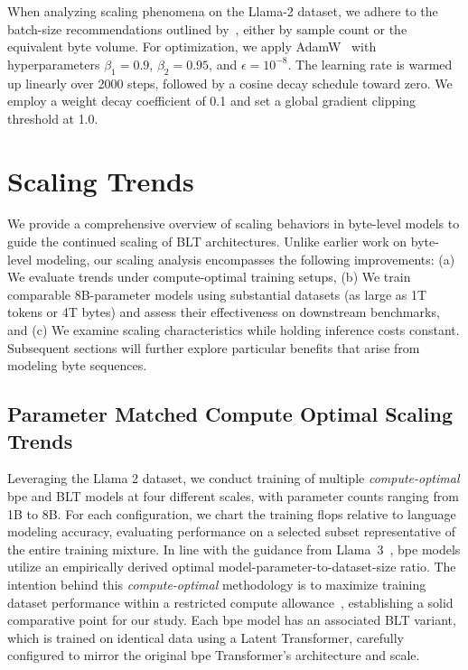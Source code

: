 When analyzing scaling phenomena on the Llama-2 dataset, we adhere to the batch-size recommendations outlined by~\cite{dubey2024llama}, either by sample count or the equivalent byte volume. For optimization, we apply AdamW~\citep{adamw} with hyperparameters $\beta_1 = 0.9$, $\beta_2 = 0.95$, and $\epsilon=10^{-8}$. The learning rate is warmed up linearly over 2000 steps, followed by a cosine decay schedule toward zero. We employ a weight decay coefficient of 0.1 and set a global gradient clipping threshold at 1.0.

\section{Scaling Trends}
\label{section:scaling}

We provide a comprehensive overview of scaling behaviors in byte-level models to guide the continued scaling of {\textsc BLT} architectures. Unlike earlier work on byte-level modeling, our scaling analysis encompasses the following improvements: (a) We evaluate trends under compute-optimal training setups, (b) We train comparable 8B-parameter models using substantial datasets (as large as 1T tokens or 4T bytes) and assess their effectiveness on downstream benchmarks, and (c) We examine scaling characteristics while holding inference costs constant. Subsequent sections will further explore particular benefits that arise from modeling byte sequences.

\subsection{Parameter Matched Compute Optimal Scaling Trends}
\label{section:parameter-matched-scaling}
Leveraging the Llama 2 dataset, we conduct training of multiple \textit{compute-optimal} bpe and {\textsc BLT} models at four different scales, with parameter counts ranging from 1B to 8B. For each configuration, we chart the training flops relative to language modeling accuracy, evaluating performance on a selected subset representative of the entire training mixture. In line with the guidance from Llama~3~\citep{dubey2024llama}, bpe models utilize an empirically derived optimal model-parameter-to-dataset-size ratio. The intention behind this \textit{compute-optimal} methodology is to maximize training dataset performance within a restricted compute allowance~\citep{hoffmann2022training}, establishing a solid comparative point for our study. Each bpe model has an associated {\textsc BLT} variant, which is trained on identical data using a Latent Transformer, carefully configured to mirror the original bpe Transformer’s architecture and scale.

